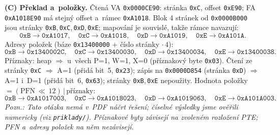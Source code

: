 \begin{priklad}
\textbf{(C) Překlad a~položky.} Čtená VA \texttt{0x0000CE90}: stránka \texttt{0xC}, offset \texttt{0xE90}; FA \texttt{0xA1018E90} má stejný offset a~rámec \texttt{0xA1018}. Blok 4 stránek od \texttt{0x0000B000} jsou stránky \texttt{0xB},\,\texttt{0xC},\,\texttt{0xD},\,\texttt{0xE}; mapování je souvislé, takže rámce navazují:
\[
\texttt{0xB}\to\texttt{0xA1017},\quad
\texttt{0xC}\to\texttt{0xA1018},\quad
\texttt{0xD}\to\texttt{0xA1019},\quad
\texttt{0xE}\to\texttt{0xA101A}.
\]
Adresy položek (báze \texttt{0x13400000} $+$ číslo stránky $\cdot\,4$):
\[
\texttt{0xB}\!\to\!\boxed{\texttt{0x1340002C}},\quad
\texttt{0xC}\!\to\!\boxed{\texttt{0x13400030}},\quad
\texttt{0xD}\!\to\!\boxed{\texttt{0x13400034}},\quad
\texttt{0xE}\!\to\!\boxed{\texttt{0x13400038}}.
\]
Příznaky: heap $\Rightarrow$ u~všech P=1, W=1, X=0 (příznakový byte \texttt{0x03}). Čtení ze stránky \texttt{0xC} $\Rightarrow$ A=1 (přidá bit~5, \texttt{0x23}); zápis na \texttt{0x0000D854} (stránka \texttt{0xD}) $\Rightarrow$ A=1 i~D=1 (přidá bit~6, \texttt{0x63}); stránky \texttt{0xB},\,\texttt{0xE} nepoužity. Hodnota položky $=(\text{PFN}\,{\ll}\,12)\,|\,\text{příznaky}$:
\[
\texttt{0xB}\!\to\!\boxed{\texttt{0xA1017003}},\quad
\texttt{0xC}\!\to\!\boxed{\texttt{0xA1018023}},\quad
\texttt{0xD}\!\to\!\boxed{\texttt{0xA1019063}},\quad
\texttt{0xE}\!\to\!\boxed{\texttt{0xA101A003}}.
\]
\textit{Pozn.: Tato otázka nemá v~PDF náčrt řešení; číselné výsledky jsme ověřili numericky (viz \texttt{priklady/}). Příznakové byty závisejí na zvoleném rozložení PTE; PFN a~adresy položek na něm nezávisejí.}
\end{priklad}
